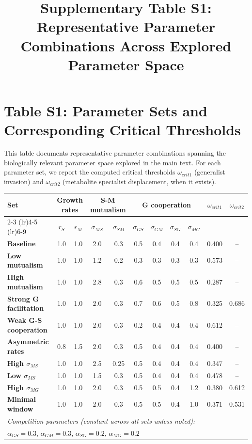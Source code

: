 \documentclass[11pt]{article}
\title{Supplementary Table S1: Representative Parameter Combinations Across Explored Parameter Space}
\author{}
\date{}
\begin{document}
\maketitle

\section*{Table S1: Parameter Sets and Corresponding Critical Thresholds}

This table documents representative parameter combinations spanning the biologically relevant parameter space explored in the main text. For each parameter set, we report the computed critical thresholds $\omega_{crit1}$ (generalist invasion) and $\omega_{crit2}$ (metabolite specialist displacement, when it exists).

\vspace{1em}

\begin{table}[h]
\centering
\small
\begin{tabular}{@{}lcccccccccc@{}}
\toprule
\multirow{2}{*}{Set} & \multicolumn{2}{c}{Growth rates} & \multicolumn{2}{c}{S-M mutualism} & \multicolumn{4}{c}{G cooperation} & \multirow{2}{*}{$\omega_{crit1}$} & \multirow{2}{*}{$\omega_{crit2}$} \\
\cmidrule(lr){2-3} \cmidrule(lr){4-5} \cmidrule(lr){6-9}
& $r_S$ & $r_M$ & $\sigma_{MS}$ & $\sigma_{SM}$ & $\sigma_{GS}$ & $\sigma_{GM}$ & $\sigma_{SG}$ & $\sigma_{MG}$ & & \\
\midrule
\textbf{Baseline} & 1.0 & 1.0 & 2.0 & 0.3 & 0.5 & 0.4 & 0.4 & 0.4 & 0.400 & -- \\
\textbf{Low mutualism} & 1.0 & 1.0 & 1.2 & 0.2 & 0.3 & 0.3 & 0.3 & 0.3 & 0.573 & -- \\
\textbf{High mutualism} & 1.0 & 1.0 & 2.8 & 0.3 & 0.6 & 0.5 & 0.5 & 0.5 & 0.287 & -- \\
\textbf{Strong G facilitation} & 1.0 & 1.0 & 2.0 & 0.3 & 0.7 & 0.6 & 0.5 & 0.8 & 0.325 & 0.686 \\
\textbf{Weak G-S cooperation} & 1.0 & 1.0 & 2.0 & 0.3 & 0.2 & 0.4 & 0.4 & 0.4 & 0.612 & -- \\
\textbf{Asymmetric rates} & 0.8 & 1.5 & 2.0 & 0.3 & 0.5 & 0.4 & 0.4 & 0.4 & 0.400 & -- \\
\textbf{High $\sigma_{MS}$} & 1.0 & 1.0 & 2.5 & 0.25 & 0.5 & 0.4 & 0.4 & 0.4 & 0.347 & -- \\
\textbf{Low $\sigma_{MS}$} & 1.0 & 1.0 & 1.5 & 0.3 & 0.5 & 0.4 & 0.4 & 0.4 & 0.478 & -- \\
\textbf{High $\sigma_{MG}$} & 1.0 & 1.0 & 2.0 & 0.3 & 0.5 & 0.5 & 0.4 & 1.2 & 0.380 & 0.612 \\
\textbf{Minimal window} & 1.0 & 1.0 & 2.0 & 0.3 & 0.5 & 0.5 & 0.4 & 1.0 & 0.371 & 0.531 \\
\midrule
\multicolumn{11}{l}{\textit{Competition parameters (constant across all sets unless noted):}} \\
\multicolumn{11}{l}{$\alpha_{GS} = 0.3$, $\alpha_{GM} = 0.3$, $\alpha_{SG} = 0.2$, $\alpha_{MG} = 0.2$} \\
\bottomrule
\end{tabular}
\end{table}
\end{document}
